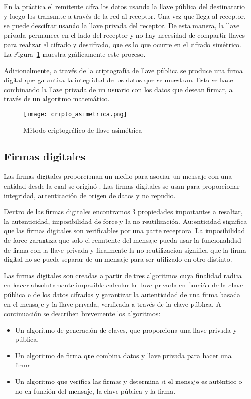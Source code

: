 En la práctica el remitente cifra los datos usando la llave pública del destinatario y luego los transmite a través de la red al receptor. Una vez que llega al receptor, se puede descifrar usando la llave privada del receptor. De esta manera, la llave privada permanece en el lado del receptor y no hay necesidad de compartir llaves para realizar el cifrado y descifrado, que es lo que ocurre en el cifrado simétrico. La Figura~\ref{blockcain_llaveasimetrica} muestra gráficamente este proceso.

Adicionalmente, a través de la criptografía de llave pública se produce una firma digital que garantiza la integridad de los datos que se muestran. Esto se hace combinando la llave privada de un usuario con los datos que desean firmar, a través de un algoritmo matemático.

\begin{figure}[h]
    \centering
    \texttt{[image: cripto\_asimetrica.png]}
     \caption{Método criptográfico de llave asimétrica} 
    \label{blockcain_llaveasimetrica}
\end{figure}

\subsection{Firmas digitales}

Las firmas digitales proporcionan un medio para asociar un mensaje con una entidad desde la cual se originó . Las firmas digitales se usan para proporcionar integridad, autenticación de origen de datos y no repudio.

Dentro de las firmas digitales encontramos 3 propiedades importantes a resaltar, la autenticidad, imposibilidad de force y la no reutilización. Autenticidad significa que las firmas digitales son verificables por una parte receptora. La  imposibilidad de force garantiza que solo el remitente del mensaje pueda usar la funcionalidad de firma con la llave privada y finalmente la no reutilización significa que la firma digital no se puede separar de un mensaje para ser utilizado en otro distinto.

Las firmas digitales son creadas a partir de tres algoritmos cuya finalidad radica en 
hacer absolutamente imposible calcular la llave privada en función de la clave pública o de los datos cifrados y garantizar la autenticidad de una firma basada en el mensaje y la llave privada, verificada a través de la clave pública. A continuación  se describen brevemente los algoritmos:
\begin{itemize}
    \item Un algoritmo de generación de claves, que proporciona una llave privada y pública.
    \item Un algoritmo de firma que combina datos y llave privada para hacer una firma.
    \item Un algoritmo que verifica las firmas y determina si el mensaje es auténtico o no en función del mensaje, la clave pública y la firma.
\end{itemize}

